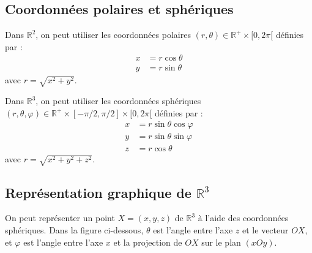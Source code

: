 \subsection{Coordonnées polaires et sphériques}

Dans $\mathbb{R}^2$, on peut utiliser les coordonnées polaires $(r, \theta) \in \mathbb{R}^+ \times [0, 2\pi[$ définies par :
\begin{align*}
    x &= r \cos \theta \\
    y &= r \sin \theta
\end{align*}
avec $r = \sqrt{x^2 + y^2}$.

Dans $\mathbb{R}^3$, on peut utiliser les coordonnées sphériques $(r, \theta, \varphi) \in \mathbb{R}^+ \times [-\pi/2, \pi/2] \times [0, 2\pi[$ définies par :
\begin{align*}
    x &= r \sin \theta \cos \varphi \\
    y &= r \sin \theta \sin \varphi \\
    z &= r \cos \theta
\end{align*}
avec $r = \sqrt{x^2 + y^2 + z^2}$.

\subsection{Représentation graphique de $\mathbb{R}^3$}

On peut représenter un point $X = (x, y, z)$ de $\mathbb{R}^3$ à l'aide des coordonnées sphériques.
Dans la figure ci-dessous, $\theta$ est l'angle entre l'axe $z$ et le vecteur $OX$, et $\varphi$ est l'angle entre l'axe $x$ et la projection de $OX$ sur le plan $(xOy)$.

